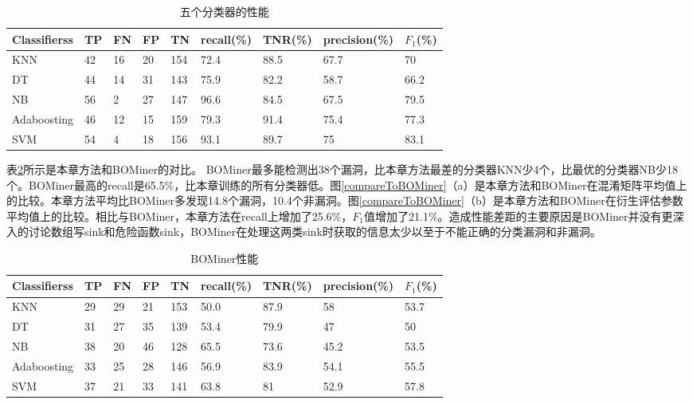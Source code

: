 {\begin{table}[ht]
\begin{center}
\caption{五个分类器的性能} \label{PERFORMANCES_OF_OUR_FIVE_CLASSIFIER_ALGORITHMS}
\begin{small}
\begin{tabular}{lllllllll}
\hline
 {\bf Classifierss}& {\bf TP} & {\bf FN} & {\bf FP} & {\bf TN} & {\bf recall(\%)} & {\bf TNR(\%)} & {\bf precision(\%)} & {\bf $F_1$(\%)}\\ \hline
KNN & 42 & 16 & 20 & 154 & 72.4 & 88.5 & 67.7 & 70\\ \hline
DT & 44 & 14 & 31 & 143 & 75.9 & 82.2 & 58.7 & 66.2\\ \hline
NB & 56 & 2 & 27 & 147 & 96.6 & 84.5 & 67.5 & 79.5\\ \hline
Adaboosting & 46 & 12 & 15 & 159 & 79.3 & 91.4 & 75.4 & 77.3\\ \hline
SVM & 54 & 4 & 18 & 156 & 93.1 & 89.7 & 75 & 83.1\\ \hline
\end{tabular}
\end{small}
\end{center}
\end{table}

表\ref{PERFORMANCE_OF_BOMINER_FOR_OUR_TEST_SUITE}所示是本章方法和BOMiner的对比。
BOMiner最多能检测出38个漏洞，比本章方法最差的分类器KNN少4个，比最优的分类器NB少18个。BOMiner最高的recall是65.5\%，比本章训练的所有分类器低。图\ref{compareToBOMiner}（a）是本章方法和BOMiner在混淆矩阵平均值上的比较。本章方法平均比BOMiner多发现14.8个漏洞，10.4个非漏洞。图\ref{compareToBOMiner}（b）是本章方法和BOMiner在衍生评估参数平均值上的比较。相比与BOMiner，本章方法在recall上增加了25.6\%，$F_1$值增加了21.1\%。造成性能差距的主要原因是BOMiner并没有更深入的讨论数组写sink和危险函数sink，BOMiner在处理这两类sink时获取的信息太少以至于不能正确的分类漏洞和非漏洞。

\begin{table}[ht]
\begin{center}
\caption{BOMiner性能} \label{PERFORMANCE_OF_BOMINER_FOR_OUR_TEST_SUITE}
\begin{small}
\begin{tabular}{lllllllll}
\hline
 {\bf Classifierss}& {\bf TP} & {\bf FN} & {\bf FP} & {\bf TN} & {\bf recall(\%)} & {\bf TNR(\%)} & {\bf precision(\%)} & {\bf $F_1$(\%)}\\ \hline
KNN & 29 & 29 & 21 & 153 & 50.0 & 87.9 & 58 & 53.7\\ \hline
DT & 31 & 27 & 35 & 139 & 53.4 & 79.9 & 47 & 50\\ \hline
NB & 38 & 20 & 46 & 128 & 65.5 & 73.6 & 45.2 & 53.5\\ \hline
Adaboosting & 33 & 25 & 28 & 146 & 56.9 & 83.9 & 54.1 & 55.5\\ \hline
SVM & 37 & 21 & 33 & 141 & 63.8 & 81 & 52.9 & 57.8\\ \hline
\end{tabular}
\end{small}
\end{center}
\end{table}

}
